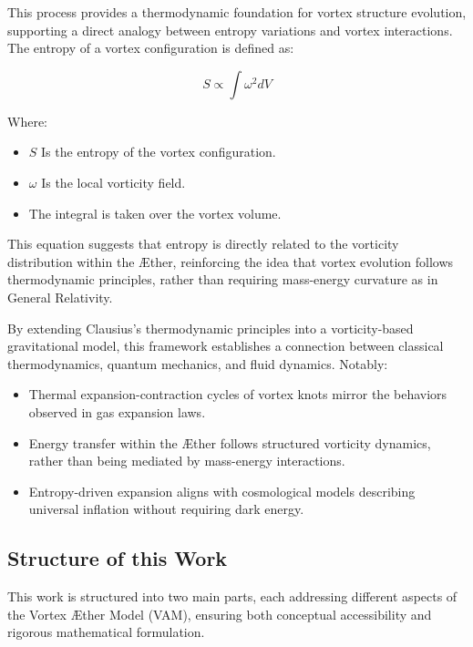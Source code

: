 \documentclass[a4paper,10pt]{article}
\begin{document}
This process provides a thermodynamic foundation for vortex structure evolution, supporting a direct analogy between entropy variations and vortex interactions.
The entropy of a vortex configuration is defined as:

\begin{equation*} \label{eq:Entropy}
S \propto \int \omega^2 dV
\end{equation*}

Where:

\begin{itemize}
    \item \( S \) Is the entropy of the vortex configuration.
    \item \( \omega \)  Is the local vorticity field.
    \item The integral is taken over the vortex volume.
\end{itemize}

This equation suggests that entropy is directly related to the vorticity distribution within the Æther, reinforcing the idea that vortex evolution follows thermodynamic principles, rather than requiring mass-energy curvature as in General Relativity.

By extending Clausius's thermodynamic principles into a vorticity-based gravitational model, this framework establishes a connection between classical thermodynamics, quantum mechanics, and fluid dynamics. Notably:

\begin{itemize}
    \item Thermal expansion-contraction cycles of vortex knots mirror the behaviors observed in gas expansion laws.
    \item Energy transfer within the Æther follows structured vorticity dynamics, rather than being mediated by mass-energy interactions.
    \item Entropy-driven expansion aligns with cosmological models describing universal inflation without requiring dark energy.
\end{itemize}

\subsection*{Structure of this Work}

This work is structured into two main parts, each addressing different aspects of the Vortex Æther Model (VAM), ensuring both conceptual accessibility and rigorous mathematical formulation.
\end{document}
